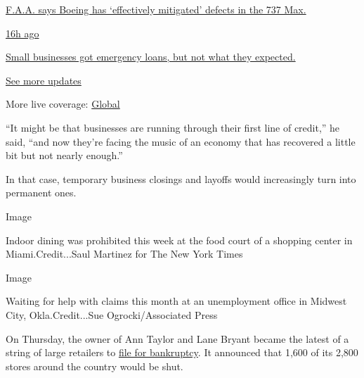 \href{https://www.nytimes.com/live/2020/08/03/business/stock-market-today-coronavirus?action=click\&pgtype=Article\&state=default\&region=MAIN_CONTENT_1\&context=storylines_live_updates\#faa-says-boeing-has-effectively-mitigated-defects-in-the-737-max}{F.A.A.
says Boeing has `effectively mitigated' defects in the 737 Max.}

\href{https://www.nytimes.com/live/2020/08/03/business/stock-market-today-coronavirus?action=click\&pgtype=Article\&state=default\&region=MAIN_CONTENT_1\&context=storylines_live_updates\#small-businesses-got-emergency-loans-but-not-what-they-expected}{16h
ago}

\href{https://www.nytimes.com/live/2020/08/03/business/stock-market-today-coronavirus?action=click\&pgtype=Article\&state=default\&region=MAIN_CONTENT_1\&context=storylines_live_updates\#small-businesses-got-emergency-loans-but-not-what-they-expected}{Small
businesses got emergency loans, but not what they expected.}

\href{https://www.nytimes.com/live/2020/08/03/business/stock-market-today-coronavirus?action=click\&pgtype=Article\&state=default\&region=MAIN_CONTENT_1\&context=storylines_live_updates}{See
more updates}

More live coverage:
\href{https://www.nytimes.com/2020/08/04/world/coronavirus-covid-19.html?action=click\&pgtype=Article\&state=default\&region=MAIN_CONTENT_1\&context=storylines_live_updates}{Global}

``It might be that businesses are running through their first line of
credit,'' he said, ``and now they're facing the music of an economy that
has recovered a little bit but not nearly enough.''

In that case, temporary business closings and layoffs would increasingly
turn into permanent ones.

Image

Indoor dining was prohibited this week at the food court of a shopping
center in Miami.Credit...Saul Martinez for The New York Times

Image

Waiting for help with claims this month at an unemployment office in
Midwest City, Okla.Credit...Sue Ogrocki/Associated Press

On Thursday, the owner of Ann Taylor and Lane Bryant became the latest
of a string of large retailers to
\href{https://www.nytimes.com/2020/07/23/business/ascena-bankruptcy-ann-taylor-lane-bryant.html}{file
for bankruptcy}. It announced that 1,600 of its 2,800 stores around the
country would be shut.

